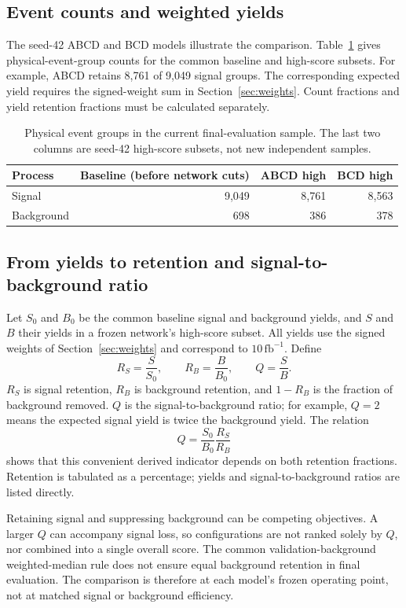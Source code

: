 \documentclass[11pt,a4paper]{article}
\begin{document}
\subsection{Event counts and weighted yields}
The seed-42 ABCD and BCD models illustrate the comparison.
Table~\ref{tab:groups} gives physical-event-group counts for the common baseline and high-score subsets.
For example, ABCD retains 8,761 of 9,049 signal groups. The corresponding expected yield requires the signed-weight sum in Section~\ref{sec:weights}.
Count fractions and yield retention fractions must be calculated separately.
\begin{table}[H]
\caption{Physical event groups in the current final-evaluation sample. The last two columns are seed-42 high-score subsets, not new independent samples.}
\label{tab:groups}
\centering
\begin{tabular}{lrrr}
\toprule
Process & Baseline (before network cuts) & ABCD high & BCD high \\
\midrule
Signal & 9,049 & 8,761 & 8,563 \\
Background & 698 & 386 & 378 \\
\bottomrule
\end{tabular}
\end{table}

\subsection{From yields to retention and signal-to-background ratio}
Let $S_0$ and $B_0$ be the common baseline signal and background yields, and $S$ and $B$ their yields in a frozen network's high-score subset.
All yields use the signed weights of Section~\ref{sec:weights} and correspond to $10\,\mathrm{fb}^{-1}$.
Define
\[
 R_S=\frac{S}{S_0},\qquad R_B=\frac{B}{B_0},\qquad Q=\frac{S}{B}.
\]
$R_S$ is signal retention, $R_B$ is background retention, and $1-R_B$ is the fraction of background removed.
$Q$ is the signal-to-background ratio; for example, $Q=2$ means the expected signal yield is twice the background yield.
The relation
\[
 Q=\frac{S_0}{B_0}\frac{R_S}{R_B}
\]
shows that this convenient derived indicator depends on both retention fractions.
Retention is tabulated as a percentage; yields and signal-to-background ratios are listed directly.

Retaining signal and suppressing background can be competing objectives.
A larger $Q$ can accompany signal loss, so configurations are not ranked solely by $Q$, nor combined into a single overall score.
The common validation-background weighted-median rule does not ensure equal background retention in final evaluation.
The comparison is therefore at each model's frozen operating point, not at matched signal or background efficiency.
\end{document}
